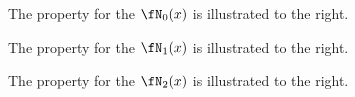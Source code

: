 \begin{minipage}{\tw-105mm}%
\begin{example}
\label{ex:n0_pounity}
The  property for the 
 $\fN_0(x)$  
is illustrated to the right.
\end{example}
\end{minipage}
\hfill{}

\begin{minipage}{\tw-105mm}%
\begin{example}
\label{ex:n1_pounity}
The  property for the 
 $\fN_1(x)$  
is illustrated to the right.
\end{example}
\end{minipage}
\hfill{}

\begin{minipage}{\tw-105mm}%
\begin{example}
\label{ex:n2_pounity}
The  property for the 
 $\fN_2(x)$  
is illustrated to the right.
\end{example}
\end{minipage}
\hfill{}

